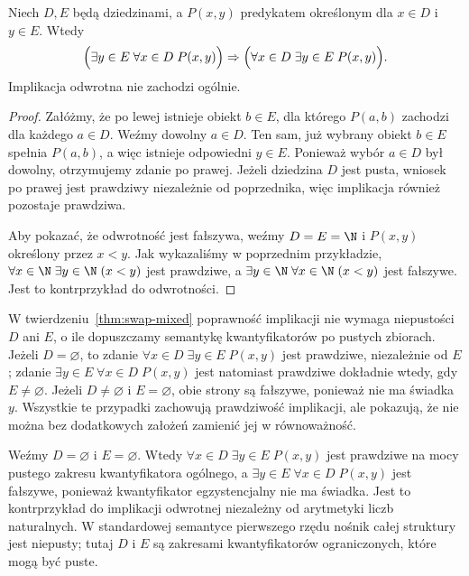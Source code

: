 \begin{twierdzenie}
\label{thm:swap-mixed}
Niech $D,E$ będą dziedzinami, a $P(x,y)$ predykatem
określonym dla $x\in D$ i $y\in E$. Wtedy
\[
\Bigl(\exists y\in E\;\forall x\in D\;P(x,y)\Bigr)
\Rightarrow
\Bigl(\forall x\in D\;\exists y\in E\;P(x,y)\Bigr).
\]
Implikacja odwrotna nie zachodzi ogólnie.
\end{twierdzenie}
\begin{proof}
Załóżmy, że po lewej istnieje obiekt $b\in E$,
dla którego $P(a,b)$ zachodzi dla każdego $a\in D$.
Weźmy dowolny $a\in D$. Ten sam, już wybrany
obiekt $b\in E$ spełnia $P(a,b)$, a więc
istnieje odpowiedni $y\in E$. Ponieważ wybór
$a\in D$ był dowolny, otrzymujemy zdanie po prawej.
Jeżeli dziedzina $D$ jest pusta, wniosek po prawej jest
prawdziwy niezależnie od poprzednika, więc
implikacja również pozostaje prawdziwa.

Aby pokazać, że odwrotność jest fałszywa,
weźmy $D=E=\N$ i $P(x,y)$ określony przez $x<y$.
Jak wykazaliśmy w poprzednim przykładzie,
$\forall x\in\N\;\exists y\in\N\;(x<y)$
jest prawdziwe, a
$\exists y\in\N\;\forall x\in\N\;(x<y)$
jest fałszywe. Jest to kontrprzykład do odwrotności.
\end{proof}

\begin{uwaga}
\label{rem:mixed-quantifiers-empty-domains-lxiii}
W twierdzeniu~\ref{thm:swap-mixed} poprawność implikacji
nie wymaga niepustości $D$ ani $E$, o ile dopuszczamy
semantykę kwantyfikatorów po pustych zbiorach.
Jeżeli $D=\varnothing$, to zdanie
$\forall x\in D\;\exists y\in E\;P(x,y)$ jest prawdziwe,
niezależnie od $E$; zdanie
$\exists y\in E\;\forall x\in D\;P(x,y)$
jest natomiast prawdziwe dokładnie wtedy, gdy $E\ne\varnothing$.
Jeżeli $D\ne\varnothing$ i $E=\varnothing$, obie strony są
fałszywe, ponieważ nie ma świadka $y$.
Wszystkie te przypadki zachowują prawdziwość implikacji,
ale pokazują, że nie można bez dodatkowych założeń
zamienić jej w równoważność.
\end{uwaga}
\begin{przyklad}
\label{ex:mixed-quantifiers-empty-lxiii}
Weźmy $D=\varnothing$ i $E=\varnothing$.
Wtedy $\forall x\in D\;\exists y\in E\;P(x,y)$ jest
prawdziwe na mocy pustego zakresu kwantyfikatora ogólnego,
a $\exists y\in E\;\forall x\in D\;P(x,y)$ jest fałszywe,
ponieważ kwantyfikator egzystencjalny nie ma świadka.
Jest to kontrprzykład do implikacji odwrotnej niezależny
od arytmetyki liczb naturalnych. W standardowej semantyce
pierwszego rzędu nośnik całej struktury jest niepusty;
tutaj $D$ i $E$ są zakresami kwantyfikatorów ograniczonych,
które mogą być puste.
\end{przyklad}

